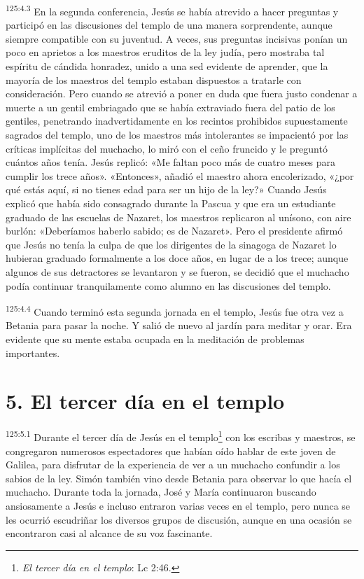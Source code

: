 \par 
\textsuperscript{125:4.3} En la segunda conferencia, Jesús se había atrevido a hacer preguntas y participó en las discusiones del templo de una manera sorprendente, aunque siempre compatible con su juventud. A veces, sus preguntas incisivas ponían un poco en aprietos a los maestros eruditos de la ley judía, pero mostraba tal espíritu de cándida honradez, unido a una sed evidente de aprender, que la mayoría de los maestros del templo estaban dispuestos a tratarle con consideración. Pero cuando se atrevió a poner en duda que fuera justo condenar a muerte a un gentil embriagado que se había extraviado fuera del patio de los gentiles, penetrando inadvertidamente en los recintos prohibidos supuestamente sagrados del templo, uno de los maestros más intolerantes se impacientó por las críticas implícitas del muchacho, lo miró con el ceño fruncido y le preguntó cuántos años tenía. Jesús replicó: «Me faltan poco más de cuatro meses para cumplir los trece años». «Entonces», añadió el maestro ahora encolerizado, «¿por qué estás aquí, si no tienes edad para ser un hijo de la ley?» Cuando Jesús explicó que había sido consagrado durante la Pascua y que era un estudiante graduado de las escuelas de Nazaret, los maestros replicaron al unísono, con aire burlón: «Deberíamos haberlo sabido; es de Nazaret». Pero el presidente afirmó que Jesús no tenía la culpa de que los dirigentes de la sinagoga de Nazaret lo hubieran graduado formalmente a los doce años, en lugar de a los trece; aunque algunos de sus detractores se levantaron y se fueron, se decidió que el muchacho podía continuar tranquilamente como alumno en las discusiones del templo.

\par 
\textsuperscript{125:4.4} Cuando terminó esta segunda jornada en el templo, Jesús fue otra vez a Betania para pasar la noche. Y salió de nuevo al jardín para meditar y orar. Era evidente que su mente estaba ocupada en la meditación de problemas importantes.

\section*{5. El tercer día en el templo}
\par 
\textsuperscript{125:5.1} Durante el tercer día de Jesús en el templo\footnote{\textit{El tercer día en el templo}: Lc 2:46.} con los escribas y maestros, se congregaron numerosos espectadores que habían oído hablar de este joven de Galilea, para disfrutar de la experiencia de ver a un muchacho confundir a los sabios de la ley. Simón también vino desde Betania para observar lo que hacía el muchacho. Durante toda la jornada, José y María continuaron buscando ansiosamente a Jesús e incluso entraron varias veces en el templo, pero nunca se les ocurrió escudriñar los diversos grupos de discusión, aunque en una ocasión se encontraron casi al alcance de su voz fascinante.

